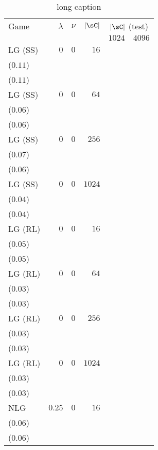 \begin{table}[t]
\centering
\caption[short caption]{long caption}
\label{table:lg_celeba_0_test_topsim_classif}
\begin{tabular}{lrrrrr}
\toprule
Game & \(\lambda\) & \(\nu\) & \(|\sC|\) & \multicolumn{2}{c}{\(|\sC|\) (test)} \\[1ex]
 &  &  &  & \multicolumn{1}{c}{\(1024\)} & \multicolumn{1}{c}{\(4096\)} \\
\midrule
LG {\scriptsize(SS)} & \(0\) & \(0\) & \(16\) & \longcell{\(0.38\)\\{\tiny(\(0.11\))}} & \longcell{\(0.40\)\\{\tiny(\(0.11\))}} \\[2.2ex]
LG {\scriptsize(SS)} & \(0\) & \(0\) & \(64\) & \longcell{\(0.36\)\\{\tiny(\(0.06\))}} & \longcell{\(0.37\)\\{\tiny(\(0.06\))}} \\[2.2ex]
LG {\scriptsize(SS)} & \(0\) & \(0\) & \(256\) & \longcell{\(0.36\)\\{\tiny(\(0.07\))}} & \longcell{\(0.37\)\\{\tiny(\(0.06\))}} \\[2.2ex]
LG {\scriptsize(SS)} & \(0\) & \(0\) & \(1024\) & \longcell{\(0.33\)\\{\tiny(\(0.04\))}} & \longcell{\(0.34\)\\{\tiny(\(0.04\))}} \\[2.2ex]
LG {\scriptsize(RL)} & \(0\) & \(0\) & \(16\) & \longcell{\(0.44\)\\{\tiny(\(0.05\))}} & \longcell{\(0.45\)\\{\tiny(\(0.05\))}} \\[2.2ex]
LG {\scriptsize(RL)} & \(0\) & \(0\) & \(64\) & \longcell{\(0.42\)\\{\tiny(\(0.03\))}} & \longcell{\(0.43\)\\{\tiny(\(0.03\))}} \\[2.2ex]
LG {\scriptsize(RL)} & \(0\) & \(0\) & \(256\) & \longcell{\(0.39\)\\{\tiny(\(0.03\))}} & \longcell{\(0.40\)\\{\tiny(\(0.03\))}} \\[2.2ex]
LG {\scriptsize(RL)} & \(0\) & \(0\) & \(1024\) & \longcell{\(0.33\)\\{\tiny(\(0.03\))}} & \longcell{\(0.34\)\\{\tiny(\(0.03\))}} \\[2.2ex]
NLG & \(0.25\) & \(0\) & \(16\) & \longcell{\(0.39\)\\{\tiny(\(0.06\))}} & \longcell{\(0.41\)\\{\tiny(\(0.06\))}} \\[2.2ex]

\end{tabular}
\end{table}
